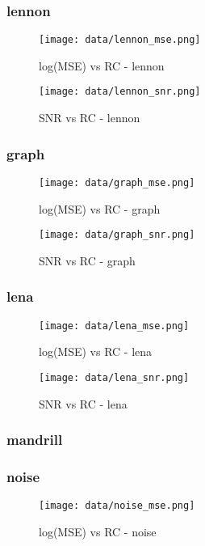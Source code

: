 \documentclass[12pt,a4paper]{article}
\begin{document}
\subsubsection{lennon}
\begin{figure}[H]
    \centering
    \texttt{[image: data/lennon\_mse.png]}
    \caption{log(MSE) vs RC - lennon}
    
\end{figure}

\begin{figure}[H]
    \centering
    \texttt{[image: data/lennon\_snr.png]}
    \caption{SNR vs RC - lennon}
    
\end{figure}

\subsubsection{graph}
\begin{figure}[H]
    \centering
    \texttt{[image: data/graph\_mse.png]}
    \caption{log(MSE) vs RC - graph}
    
\end{figure}

\begin{figure}[H]
    \centering
    \texttt{[image: data/graph\_snr.png]}
    \caption{SNR vs RC - graph}
    
\end{figure}

\subsubsection{lena}
\begin{figure}[H]
    \centering
    \texttt{[image: data/lena\_mse.png]}
    \caption{log(MSE) vs RC - lena}
    
\end{figure}

\begin{figure}[H]
    \centering
    \texttt{[image: data/lena\_snr.png]}
    \caption{SNR vs RC - lena}
    
\end{figure}

\subsubsection{mandrill}

\subsubsection{noise}
\begin{figure}[H]
    \centering
    \texttt{[image: data/noise\_mse.png]}
    \caption{log(MSE) vs RC - noise}
    
\end{figure}
\end{document}
